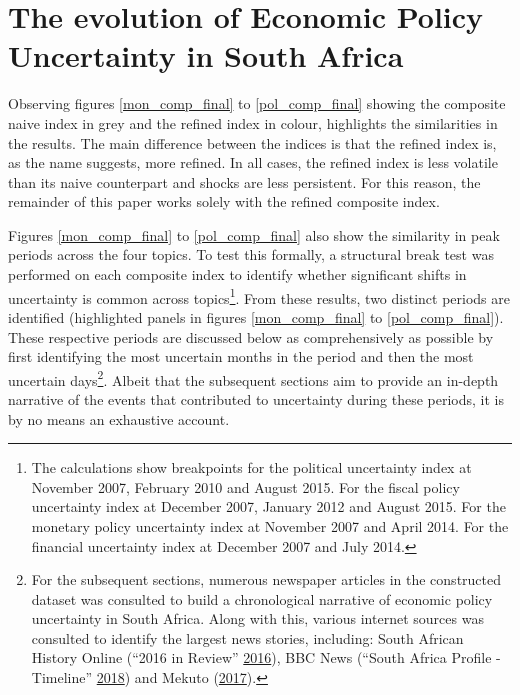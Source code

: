 \documentclass[11pt,preprint, authoryear]{elsarticle}
\numberwithin{equation}{section}
\numberwithin{figure}{section}
\numberwithin{table}{section}
\let\rmarkdownfootnote\footnote%
\def\footnote{\protect\rmarkdownfootnote}
\begin{document}
\section{\texorpdfstring{The evolution of Economic Policy Uncertainty in
South Africa
\label{sec_discuss}}{The evolution of Economic Policy Uncertainty in South Africa }}\label{the-evolution-of-economic-policy-uncertainty-in-south-africa}

Observing figures \ref{mon_comp_final} to \ref{pol_comp_final} showing
the composite naive index in grey and the refined index in colour,
highlights the similarities in the results. The main difference between
the indices is that the refined index is, as the name suggests, more
refined. In all cases, the refined index is less volatile than its naive
counterpart and shocks are less persistent. For this reason, the
remainder of this paper works solely with the refined composite index.

Figures \ref{mon_comp_final} to \ref{pol_comp_final} also show the
similarity in peak periods across the four topics. To test this
formally, a structural break test was performed on each composite index
to identify whether significant shifts in uncertainty is common across
topics\footnote{The calculations show breakpoints for the political
  uncertainty index at November 2007, February 2010 and August 2015. For
  the fiscal policy uncertainty index at December 2007, January 2012 and
  August 2015. For the monetary policy uncertainty index at November
  2007 and April 2014. For the financial uncertainty index at December
  2007 and July 2014.}. From these results, two distinct periods are
identified (highlighted panels in figures \ref{mon_comp_final} to
\ref{pol_comp_final}). These respective periods are discussed below as
comprehensively as possible by first identifying the most uncertain
months in the period and then the most uncertain days\footnote{For the
  subsequent sections, numerous newspaper articles in the constructed
  dataset was consulted to build a chronological narrative of economic
  policy uncertainty in South Africa. Along with this, various internet
  sources was consulted to identify the largest news stories, including:
  South African History Online (``2016 in Review''
  \protect\hyperlink{ref-2016}{2016}), BBC News (``South Africa Profile
  - Timeline'' \protect\hyperlink{ref-2018}{2018}) and Mekuto
  (\protect\hyperlink{ref-Mekuto2017}{2017}).}. Albeit that the
subsequent sections aim to provide an in-depth narrative of the events
that contributed to uncertainty during these periods, it is by no means
an exhaustive account.
\end{document}
